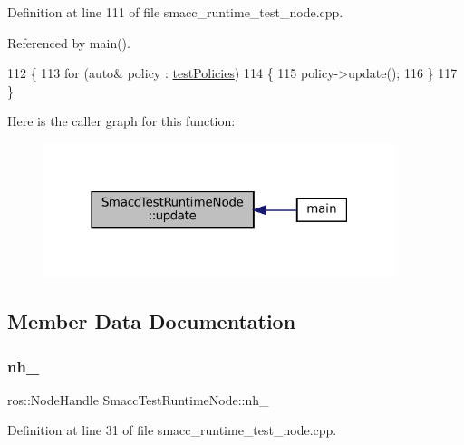 Definition at line 111 of file smacc\+\_\+runtime\+\_\+test\+\_\+node.\+cpp.



Referenced by main().


\begin{DoxyCode}
112   \{
113     \textcolor{keywordflow}{for} (\textcolor{keyword}{auto}& policy : \hyperlink{classSmaccTestRuntimeNode_a099952c0249a6f4f94469d991a644b69}{testPolicies})
114     \{
115       policy->update();
116     \}
117   \}
\end{DoxyCode}
Here is the caller graph for this function\+:
\nopagebreak
\begin{figure}[H]
\begin{center}
\leavevmode
\includegraphics[width=291pt]{classSmaccTestRuntimeNode_a0cdde5c108219ca3d7db941676fc1dcf_icgraph}
\end{center}
\end{figure}


\subsection{Member Data Documentation}
\mbox{\label{classSmaccTestRuntimeNode_a7521807a7f051ca753672ee459f93d4a}} 
\subsubsection{\texorpdfstring{nh\+\_\+}{nh\_}}
{\footnotesize\ttfamily ros\+::\+Node\+Handle Smacc\+Test\+Runtime\+Node\+::nh\+\_\+}



Definition at line 31 of file smacc\+\_\+runtime\+\_\+test\+\_\+node.\+cpp.

\mbox{\label{classSmaccTestRuntimeNode_a9b544f3ca3684171cbb56d97aadeac17}} 
